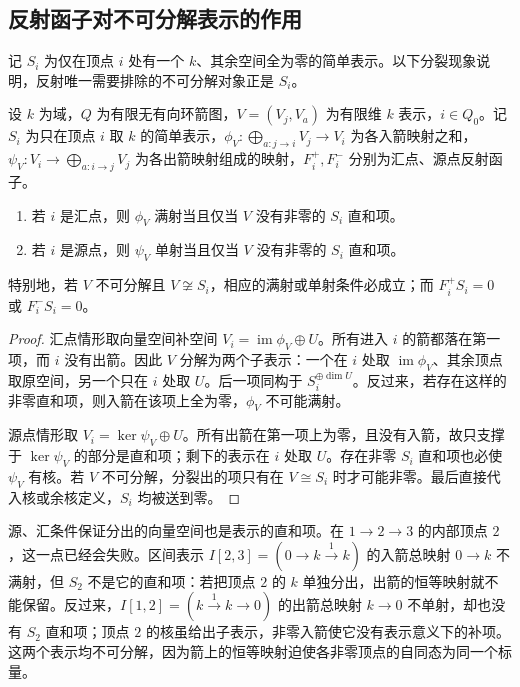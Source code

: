 \subsection{反射函子对不可分解表示的作用}
\label{b5:subsec:1002:02}

记 \(S_i\) 为仅在顶点 \(i\) 处有一个 \(k\)、其余空间全为零的简单表示。以下分裂现象说明，反射唯一需要排除的不可分解对象正是 \(S_i\)。

\begin{lemma}\label{b5:lem:reflection-split-simple}
	设 \(k\) 为域，\(Q\) 为有限无有向环箭图，\(V=(V_j,V_a)\) 为有限维 \(k\) 表示，\(i\in Q_0\)。记 \(S_i\) 为只在顶点 \(i\) 取 \(k\) 的简单表示，\(\phi_V:\bigoplus_{a:j\to i}V_j\to V_i\) 为各入箭映射之和，\(\psi_V:V_i\to\bigoplus_{a:i\to j}V_j\) 为各出箭映射组成的映射，\(F_i^+,F_i^-\) 分别为汇点、源点反射函子。
	\begin{enumerate}
		\item 若 \(i\) 是汇点，则 \(\phi_V\) 满射当且仅当 \(V\) 没有非零的 \(S_i\) 直和项。
		\item 若 \(i\) 是源点，则 \(\psi_V\) 单射当且仅当 \(V\) 没有非零的 \(S_i\) 直和项。
	\end{enumerate}
	特别地，若 \(V\) 不可分解且 \(V\not\cong S_i\)，相应的满射或单射条件必成立；而 \(F_i^+S_i=0\) 或 \(F_i^-S_i=0\)。
\end{lemma}
\begin{proof}
	汇点情形取向量空间补空间 \(V_i=\operatorname{im}\phi_V\oplus U\)。所有进入 \(i\) 的箭都落在第一项，而 \(i\) 没有出箭。因此 \(V\) 分解为两个子表示：一个在 \(i\) 处取 \(\operatorname{im}\phi_V\)、其余顶点取原空间，另一个只在 \(i\) 处取 \(U\)。后一项同构于 \(S_i^{\oplus\dim U}\)。反过来，若存在这样的非零直和项，则入箭在该项上全为零，\(\phi_V\) 不可能满射。

	源点情形取 \(V_i=\ker\psi_V\oplus U\)。所有出箭在第一项上为零，且没有入箭，故只支撑于 \(\ker\psi_V\) 的部分是直和项；剩下的表示在 \(i\) 处取 \(U\)。存在非零 \(S_i\) 直和项也必使 \(\psi_V\) 有核。若 \(V\) 不可分解，分裂出的项只有在 \(V\cong S_i\) 时才可能非零。最后直接代入核或余核定义，\(S_i\) 均被送到零。
\end{proof}

源、汇条件保证分出的向量空间也是表示的直和项。在 \(1\to2\to3\) 的内部顶点 \(2\)，这一点已经会失败。区间表示 \(I[2,3]=(0\to k\xrightarrow{1}k)\) 的入箭总映射 \(0\to k\) 不满射，但 \(S_2\) 不是它的直和项：若把顶点 \(2\) 的 \(k\) 单独分出，出箭的恒等映射就不能保留。反过来，\(I[1,2]=(k\xrightarrow{1}k\to0)\) 的出箭总映射 \(k\to0\) 不单射，却也没有 \(S_2\) 直和项；顶点 \(2\) 的核虽给出子表示，非零入箭使它没有表示意义下的补项。这两个表示均不可分解，因为箭上的恒等映射迫使各非零顶点的自同态为同一个标量。

